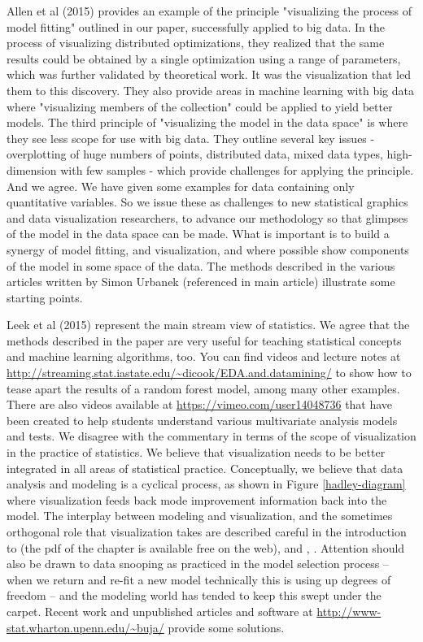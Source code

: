 \documentclass[preprint]{imsart}
\begin{document}
Allen et al (2015)  provides an example of the principle "visualizing the process of model fitting" outlined in our paper, successfully applied to big data. In the process of visualizing distributed optimizations, they realized that the same results could be obtained by a single optimization using a range of parameters, which was further validated by theoretical work. It was the visualization that led them to this discovery. They also provide areas in machine learning with big data where "visualizing members of the collection" could be applied to yield better models. The third principle of "visualizing the model in the data space" is where they see less scope for use with big data. They outline several key issues - overplotting of huge numbers of points, distributed data, mixed data types, high-dimension with few samples - which provide challenges for applying the principle. And we agree. We have given some examples for data containing only quantitative variables. So we issue these as challenges to new statistical graphics and data visualization researchers, to advance our methodology so that glimpses of the model in the data space can be made. What is important is to build a synergy of model fitting, and visualization, and where possible show components of the model in some space of the data. The methods described in the various articles written by Simon Urbanek (referenced in main article)  illustrate some starting points. 

Leek et al (2015) represent the main stream view of statistics. We agree that the methods described in the paper are very useful for teaching statistical concepts and machine learning algorithms, too. You can find videos and lecture notes at \url{http://streaming.stat.iastate.edu/~dicook/EDA.and.datamining/} to show how to tease apart the results of a random forest model, among many other examples. There are also videos available at \url{https://vimeo.com/user14048736} that have been created to help students understand various multivariate analysis models and tests. We disagree with the commentary in terms of the scope of visualization in the practice of statistics. We believe that visualization needs to be better integrated in all areas of statistical practice. Conceptually, we believe that data analysis and modeling is a cyclical process, as shown in Figure \ref{hadley-diagram} where visualization feeds back mode improvement information back  into the model.  The interplay between modeling and visualization, and the sometimes orthogonal role that visualization takes are described careful in the introduction to \cite{cook:2007} (the pdf of the chapter is available free on the web), and \cite{Ch95}, \cite{CH90}. Attention should also be drawn to data snooping as practiced in the model selection process -- when we return and re-fit a new model technically this is using up degrees of freedom -- and the modeling world has tended to keep this swept under the carpet. Recent work \cite{berk:2013} and unpublished articles and software at \url{http://www-stat.wharton.upenn.edu/~buja/} provide some solutions.  
\end{document}
